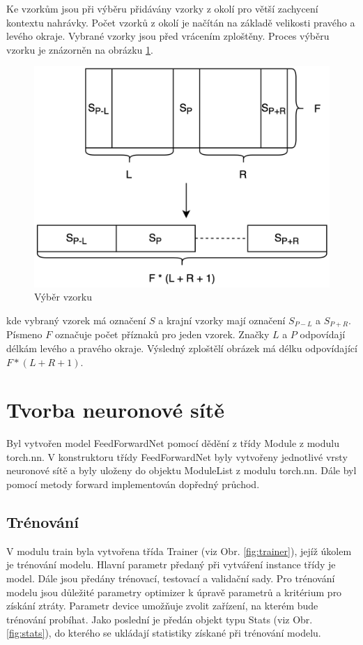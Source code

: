 \documentclass[FM,BP]{tulthesis}
\begin{document}
Ke vzorkům jsou při výběru přidávány vzorky z okolí pro větší zachycení kontextu nahrávky. Počet vzorků z okolí je načítán na základě velikosti pravého a levého okraje. Vybrané vzorky jsou před vrácením zploštěny. Proces výběru vzorku je znázorněn na obrázku \ref{fig:sample_selection}.

\begin{figure}[h]
\centerline{\includegraphics[scale=.125]{sample_selection.png}}
\caption{Výběr vzorku}
\label{fig:sample_selection}
\end{figure}
\FloatBarrier

kde vybraný vzorek má označení $ S $ a krajní vzorky mají označení $ S_{P-L} $ a $ S_{P+R} $. Písmeno $ F $ označuje počet příznaků pro jeden vzorek. Značky $ L $ a $ P $ odpovídají délkám levého a pravého okraje. Výsledný zploštělí obrázek má délku odpovídající $ F * (L + R + 1) $.

\section{Tvorba neuronové sítě}
Byl vytvořen model FeedForwardNet pomocí dědění z třídy Module z modulu torch.nn. V konstruktoru třídy FeedForwardNet byly vytvořeny jednotlivé vrsty neuronové sítě a byly uloženy do objektu ModuleList z modulu torch.nn. Dále byl pomocí metody forward implementován dopředný průchod.

\subsection{Trénování}
V modulu train byla vytvořena třída Trainer (viz Obr. \ref{fig:trainer}), jejíž úkolem je trénování modelu. Hlavní parametr předaný při vytváření instance třídy je model. Dále jsou předány trénovací, testovací a validační sady. Pro trénování modelu jsou důležité parametry optimizer k úpravě parametrů a kritérium pro získání ztráty. Parametr device umožňuje zvolit zařízení, na kterém bude trénování probíhat. Jako poslední je předán objekt typu Stats (viz Obr. \ref{fig:stats}), do kterého se ukládají statistiky získané při trénování modelu. 
\end{document}
